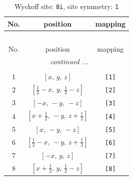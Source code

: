 \documentclass[fleqn,8pt]{jsarticle}
\begin{document}
\renewcommand{\arraystretch}{1.2}
\begin{longtable}{ccc}
\caption{Wyckoff site: {\tt 8i}, site symmetry: {\tt 1}}
 \\
 \hline \hline
No. & position & mapping \\ \hline \endfirsthead

\multicolumn{2}{l}{\tablename\ \thetable{}} \\
 \hline \hline
No. & position & mapping \\ \hline \endhead

 \hline \hline
\multicolumn{2}{r}{\footnotesize\it continued ...} \\ \endfoot

 \hline \hline
\multicolumn{2}{r}{} \\ \endlastfoot

1 & $\left[ x,\, y,\, z \right]$ & {\tt [1]} \\ \hline
2 & $\left[ \frac{1}{2} - x,\, y,\, \frac{1}{2} - z \right]$ & {\tt [2]} \\ \hline
3 & $\left[ - x,\, - y,\, - z \right]$ & {\tt [3]} \\ \hline
4 & $\left[ x + \frac{1}{2},\, - y,\, z + \frac{1}{2} \right]$ & {\tt [4]} \\ \hline
5 & $\left[ x,\, - y,\, - z \right]$ & {\tt [5]} \\ \hline
6 & $\left[ \frac{1}{2} - x,\, - y,\, z + \frac{1}{2} \right]$ & {\tt [6]} \\ \hline
7 & $\left[ - x,\, y,\, z \right]$ & {\tt [7]} \\ \hline
8 & $\left[ x + \frac{1}{2},\, y,\, \frac{1}{2} - z \right]$ & {\tt [8]} \\
\end{longtable}
\end{document}

